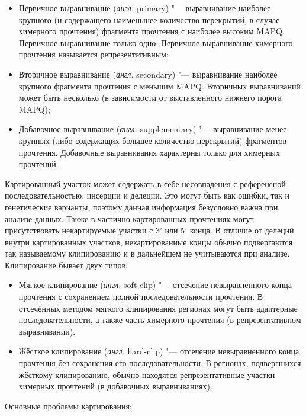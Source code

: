 \documentclass[a4paper,14pt]{extarticle}
\newcommand{\anglia}[1]{\textit{англ.} \textenglish{#1}}
\begin{document}
\begin{itemize}
\item Первичное выравнивание (\anglia{primary}) "--- выравнивание наиболее крупного (и содержащего наименьшее количество перекрытий, в случае химерного прочтения) фрагмента прочтения с наиболее высоким MAPQ.
Первичное выравнивание только одно.
Первичное выравнивание химерного прочтения называется репрезентативным;
\item Вторичное выравнивание (\anglia{secondary}) "--- выравнивание наиболее крупного фрагмента прочтения с меньшим MAPQ.
Вторичных выравниваний может быть несколько (в зависимости от выставленного нижнего порога MAPQ);
\item Добавочное выравнивание (\anglia{supplementary}) "--- выравнивание менее крупных (либо содержащих большее количество перекрытий) фрагментов прочтения.
Добавочные выравнивания характерны только для химерных прочтений.
\end{itemize}

Картированный участок может содержать в себе несовпадения с референсной последовательностью, инсерции и делеции.
Это могут быть как ошибки, так и генетические варианты, поэтому данная информация безусловно важна при анализе данных.
Также в частично картированных прочтениях могут присутствовать некартируемые участки с 3' или 5' конца.
В отличие от делеций внутри картированных участков, некартированные концы обычно подвергаются так называемому клипированию и в дальнейшем не учитываются при анализе.
Клипирование бывает двух типов:

\begin{itemize}
\item Мягкое клипирование (\anglia{soft-clip}) "--- отсечение невыравненного конца прочтения с сохранением полной последовательности прочтения.
В отсечённых методом мягкого клипирования регионах могут быть адаптерные последовательности, а также часть химерного прочтения (в репрезентативном выравнивании).
\item Жёсткое клипирование (\anglia{hard-clip}) "--- отсечение невыравненного конца прочтения без сохранения его последовательности.
В регионах, подвергшихся жёсткому клипированию, обычно находятся репрезентативные участки химерных прочтений (в добавочных выравниваниях).
\end{itemize}

Основные проблемы картирования:
\end{document}
